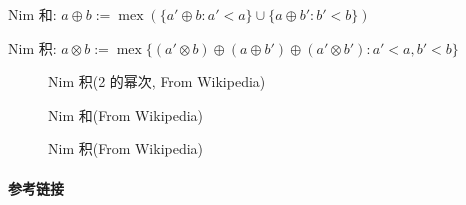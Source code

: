 Nim 和: \(a\oplus b:=\operatorname{mex}\left(\{a'\oplus b:a'<a\}\cup\{a\oplus b':b'<b\}\right)\)

Nim 积: \(a\otimes b:=\operatorname{mex}\{(a'\otimes b)\oplus(a\oplus b')\oplus(a'\otimes b'):a'<a,b'<b\}\)

\begin{figure}[h]
    \label{img:nim-prod-pow2}
    \centering
    
    \caption{Nim 积(2 的幂次, From Wikipedia)}
\end{figure}

\begin{figure}[h]
    \label{img:nim-add}
    \centering
    
    \caption{Nim 和(From Wikipedia)}
\end{figure}

\begin{figure}[h]
    \label{img:nim-prod}
    \centering
    
    \caption{Nim 积(From Wikipedia)}
\end{figure}

\paragraph{参考链接}

